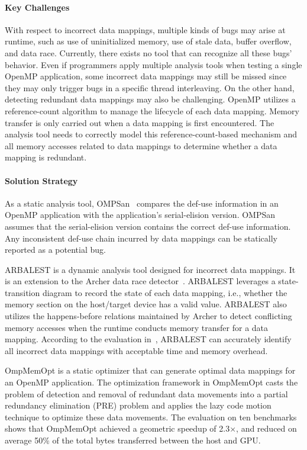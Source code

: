 \paragraph{Key Challenges}
With respect to incorrect data mappings, multiple kinds of bugs may arise at runtime, such as use of uninitialized memory, use of stale data, buffer overflow, and data race. Currently, there exists no tool that can recognize all these bugs' behavior. 
Even if programmers apply multiple analysis tools when testing a single OpenMP application, some incorrect data mappings may still be missed since they may only trigger bugs in a specific thread interleaving.
On the other hand, detecting redundant data mappings may also be challenging. OpenMP utilizes a reference-count algorithm to manage the lifecycle of each data mapping. Memory transfer is only carried out when a data mapping is first encountered.
The analysis tool needs to correctly model this reference-count-based mechanism and all memory accesses related to data mappings to determine whether a data mapping is redundant.

\paragraph{Solution Strategy}
As a static analysis tool, OMPSan~\cite{barua2019ompsan} compares the def-use information in an OpenMP application with the application's serial-elision version. OMPSan assumes that the serial-elision version contains the correct def-use information. Any inconsistent def-use chain incurred by data mappings can be statically reported as a potential bug.

ARBALEST is a dynamic analysis tool designed for incorrect data mappings. It is an extension to the Archer data race detector~\cite{atzeni2016archer}. ARBALEST leverages a state-transition diagram to record the state of each data mapping, i.e., whether the memory section on the host/target device has a valid value. ARBALEST also utilizes the happens-before relations maintained by Archer to detect conflicting memory accesses when the runtime conducts memory transfer for a data mapping.
According to the evaluation in~\cite{yu2021arbalest}, ARBALEST can accurately identify all incorrect data mappings with acceptable time and memory overhead.

OmpMemOpt\cite{barua2020ompmemopt} is a static optimizer that can generate optimal data mappings for an OpenMP application. 
The optimization framework in OmpMemOpt casts the problem of detection and removal of redundant data movements into a partial redundancy elimination (PRE) problem and applies
the lazy code motion technique to optimize these data movements.
The evaluation on ten benchmarks shows that OmpMemOpt achieved a geometric speedup of 2.3×, and reduced on average 50\% of the total bytes transferred between the host and GPU.

